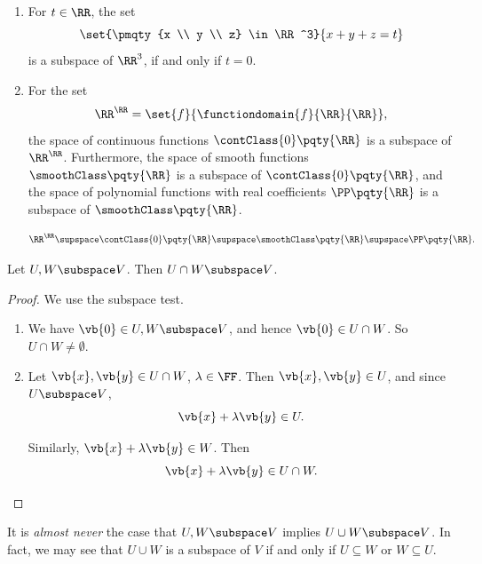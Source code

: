 \begin{example}[Subspaces]
    \begin{enumerate}
        \item For \(t \in \RR\), the set
        \[
            \set{\pmqty{x \\ y \\ z} \in \RR^3}{x + y + z = t}
        \]
        is a subspace of \(\RR^3\), if and only if \(t = 0\).
        \item For the set
        \[
            \RR^{\RR} = \set{f}{\functiondomain{f}{\RR}{\RR}},
        \]
        the space of continuous functions \(\contClass{0}\pqty{\RR}\) is a subspace of \(\RR^{\RR}\). Furthermore, the space of smooth functions \(\smoothClass\pqty{\RR}\) is a subspace of \(\contClass{0}\pqty{\RR}\), and the space of polynomial functions with real coefficients \(\PP\pqty{\RR}\) is a subspace of \(\smoothClass\pqty{\RR}\).

        \[
            \RR^{\RR} \supspace \contClass{0}\pqty{\RR} \supspace \smoothClass\pqty{\RR} \supspace \PP\pqty{\RR}.
        \]
    \end{enumerate}
\end{example}

\begin{proposition}
    Let \(U, W \subspace V\). Then \(U \cap W \subspace V\).
\end{proposition}

\begin{proof}
    We use the subspace test.
    \begin{enumerate}[label=(\alph*)]
        \item We have \(\vb{0} \in U, W \subspace V\), and hence \(\vb{0} \in U \cap W\). So \(U \cap W \neq \emptyset\).
        \item Let \(\vb{x}, \vb{y} \in U \cap W\), \(\lambda \in \FF\). Then \(\vb{x}, \vb{y} \in U\), and since \(U \subspace V\),
        \[
            \vb{x} + \lambda \vb{y} \in U.
        \]

        Similarly, \(\vb{x} + \lambda \vb{y} \in W\). Then
        \[
            \vb{x} + \lambda \vb{y} \in U \cap W.
        \]
    \end{enumerate}
\end{proof}

\begin{remark}
    It is \emph{almost never} the case that \(U, W \subspace V\) implies \(U \cup W \subspace V\). In fact, we may see that \(U \cup W\) is a subspace of \(V\) if and only if \(U \subseteq W\) or \(W \subseteq U\).
\end{remark}

